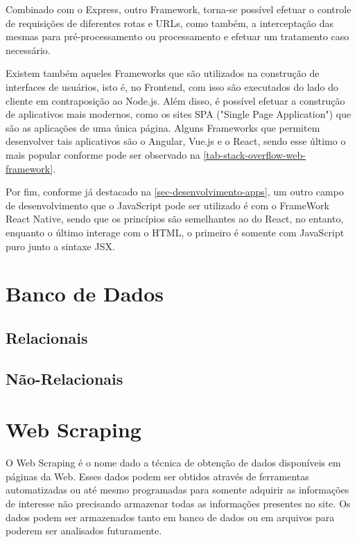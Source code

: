 Combinado com o Express, outro Framework, torna-se possível efetuar o controle de requisições de diferentes rotas e URLs, como também, a interceptação das mesmas para pré-processamento ou processamento e efetuar um tratamento caso necessário.

Existem também aqueles Frameworks que são utilizados na construção de interfaces de usuários, isto é, no Frontend, com isso são executados do lado do cliente em contraposição ao Node.js. Além disso, é possível efetuar a construção de aplicativos mais modernos, como os sites SPA ("Single Page Application") que são as aplicações de uma única página. Alguns Frameworks que permitem desenvolver tais aplicativos são o Angular, Vue.js e o React, sendo esse último o mais popular conforme pode ser observado na \autoref{tab-stack-overflow-web-framework}.

Por fim, conforme já destacado na \autoref{sec-desenvolvimento-apps}, um outro campo de desenvolvimento que o JavaScript pode ser utilizado é com o FrameWork React Native, sendo que os princípios são semelhantes ao do React, no entanto, enquanto o último interage com o HTML, o primeiro é somente com JavaScript puro junto a sintaxe JSX.

\section{Banco de Dados}

\subsection{Relacionais}

\subsection{Não-Relacionais}

\section{Web Scraping}

O Web Scraping é o nome dado a técnica de obtenção de dados disponíveis em páginas da Web. Esses dados podem ser obtidos através de ferramentas automatizadas ou até mesmo programadas para somente adquirir as informações de interesse não precisando armazenar todas as informações presentes no site.
Os dados podem ser armazenados tanto em banco de dados ou em arquivos para poderem ser analisados futuramente.

